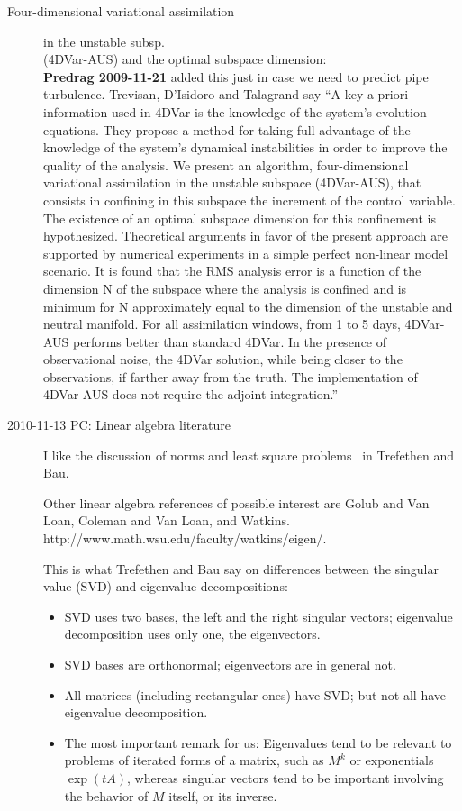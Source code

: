 \begin{description}
\item[Four-dimensional variational assimilation]
	{in the unstable subsp. \\
      (4DVar-AUS) and the optimal subspace dimension}:
	\\
{\bf Predrag
2009-11-21} added this just in case we need to predict pipe turbulence.
Trevisan, D'Isidoro and Talagrand say
``A key a priori information used in 4DVar is the knowledge of the
system's evolution equations. They propose a method for taking full
advantage of the knowledge of the system's dynamical instabilities in
order to improve the quality of the analysis. We present an
algorithm, four-dimensional variational assimilation in the unstable
subspace (4DVar-AUS), that consists in confining in this subspace the
increment of the control variable. The existence of an optimal
subspace dimension for this confinement is hypothesized. Theoretical
arguments in favor of the present approach are supported by numerical
experiments in a simple perfect non-linear model scenario. It is
found that the RMS analysis error is a function of the dimension N of
the subspace where the analysis is confined and is minimum for N
approximately equal to the dimension of the unstable and neutral
manifold. For all assimilation windows, from 1 to 5 days, 4DVar-AUS
performs better than standard 4DVar. In the presence of observational
noise, the 4DVar solution, while being closer to the observations, if
farther away from the truth. The implementation of 4DVar-AUS does not
require the adjoint integration.''

\item[2010-11-13 PC: Linear algebra literature]             \inCB
I like the discussion of norms and least square problems \etc\
in Trefethen and Bau.

Other linear algebra references of possible interest are
Golub and Van Loan,
Coleman and Van Loan, and Watkins.
\\
  {http://www.math.wsu.edu/faculty/watkins/eigen/}.

This is what Trefethen and Bau say on differences between
the singular value (SVD) and eigenvalue decompositions:
\begin{itemize}
  \item SVD uses two bases, the left and the right singular vectors;
eigenvalue decomposition uses only one, the eigenvectors.
  \item SVD bases are orthonormal; eigenvectors are in general not.
  \item All matrices (including rectangular ones) have SVD; but not all
have eigenvalue decomposition.
	\item The most important remark for us:                \inCB
Eigenvalues tend to be relevant to
problems of iterated forms of a matrix, such as $M^k$ or exponentials
$\exp(t A)$, whereas singular vectors tend to be important involving
the behavior of $M$ itself, or its inverse.
\end{itemize}


\end{description}
